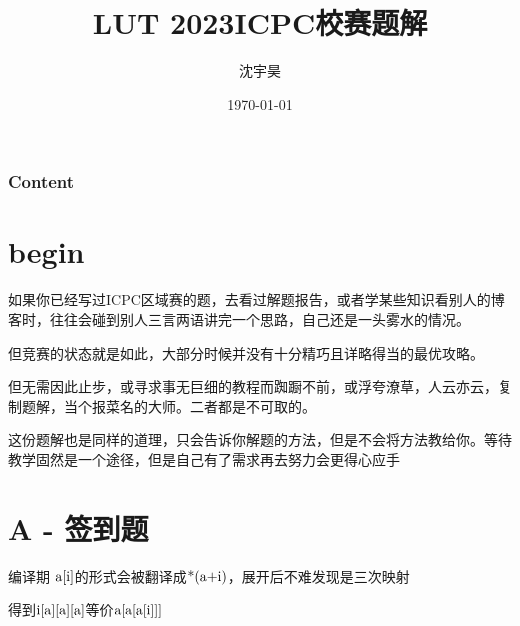 \documentclass{beamer}
\author{沈宇昊}
\title{LUT 2023ICPC校赛题解}
\date{\today}
\institute{兰州理工大学}
\begin{document}

  

  \begin{frame}[plain]
    \maketitle
  \end{frame}

  \begin{frame}
    \frametitle{Content}
    \tableofcontents %
  \end{frame}

  \section{begin}
  \begin{frame}
    如果你已经写过ICPC区域赛的题，去看过解题报告，或者学某些知识看别人的博客时，往往会碰到别人三言两语讲完一个思路，自己还是一头雾水的情况。

    \vspace*{1\baselineskip}
    
    但竞赛的状态就是如此，大部分时候并没有十分精巧且详略得当的最优攻略。
    
    \vspace*{1\baselineskip}

    但无需因此止步，或寻求事无巨细的教程而踟蹰不前，或浮夸潦草，人云亦云，复制题解，当个报菜名的大师。二者都是不可取的。
  \end{frame}

  \begin{frame}
    这份题解也是同样的道理，只会告诉你解题的方法，但是不会将方法教给你。等待教学固然是一个途径，但是自己有了需求再去努力会更得心应手
  \end{frame}

  \section{A - 签到题}
  \begin{frame}
    编译期
    $\textmd{a[i]}$的形式会被翻译成$\textmd{*(a+i)}$，展开后不难发现是三次映射

    \vspace*{1\baselineskip}

    得到$\textmd{i[a][a][a]}$等价$\textmd{a[a[a[i]]]}$
  \end{frame}
\end{document}
